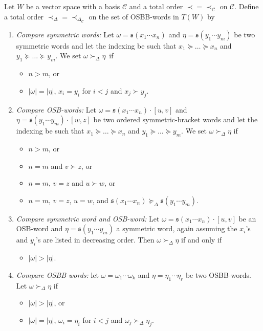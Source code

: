 \documentclass[pdftex]{sigma}
\numberwithin{equation}{section}
\begin{document}
\begin{Definition}%
 Let $W$ be a vector space with a basis $\mathcal{C}$ and a total order $\prec = \prec_{\mathcal{C}}$ on $\mathcal{C}$. Define a total order $\prec_{\Delta} = \prec_{\Delta_{\mathcal{C}}}$ on the set of OSBB-words in $T(W)$ by
 \begin{enumerate}\itemsep=0pt
 \item[(i)] \textit{Compare symmetric words:} Let $\omega = \mathfrak{s}(x_1 \cdots x_n)$ and $\eta = \mathfrak{s}(y_1 \cdots y_m)$ be two symmetric words and let the indexing be such that $x_1 \succeq \dots \succeq x_n$ and $y_1 \succeq \dots \succeq y_m$. We set $\omega \succ_{\Delta} \eta$~if
 \begin{itemize}\itemsep=0pt
 \item $n>m$, or
 \item $|\omega| = |\eta|$, $x_i = y_i$ for $i<j$ and $x_j \succ y_j$.
 \end{itemize}
 \item[(ii)] \textit{Compare OSB-words:} Let $\omega = \mathfrak{s}(x_1 \cdots x_n)\cdot[u,v]$ and $\eta = \mathfrak{s}(y_1 \cdots y_m)\cdot[w,z]$ be two ordered symmetric-bracket words and let the indexing be such that $x_1 \succeq \dots \succeq x_n$ and $y_1 \succeq \dots \succeq y_m$. We set $\omega \succ_{\Delta} \eta$ if
 \begin{itemize}\itemsep=0pt
 \item $n>m$, or
 \item $n=m$ and $v \succ z$, or
 \item $n=m$, $v=z$ and $u\succ w$, or
 \item $n=m$, $v=z$, $u=w$, and $\mathfrak{s}(x_1 \cdots x_n) \succeq_{\Delta} \mathfrak{s}(y_1 \cdots y_m)$.
 \end{itemize}
 \item[(iii)] \textit{Compare symmetric word and OSB-word:} Let $\omega = \mathfrak{s}(x_1 \cdots x_n)\cdot[u,v]$ be an OSB-word and $\eta = \mathfrak{s}(y_1 \cdots y_m)$ a symmetric word, again assuming the $x_i$'s and $y_i$'s are listed in decreasing order. Then $\omega \succ_{\Delta} \eta$ if and only if
 \begin{itemize}\itemsep=0pt
 \item $|\omega| > |\eta|$.
 \end{itemize}
 \item[(iv)] \textit{Compare OSBB-words:} let $\omega = \omega_1 \cdots \omega_k$ and $\eta = \eta_1 \cdots \eta_r$ be two OSBB-words. Let $\omega \succ_{\Delta} \eta$ if
 \begin{itemize}\itemsep=0pt
 \item $|\omega| > |\eta|$, or
 \item $|\omega|=|\eta|$, $\omega_i = \eta_i$ for $i<j$ and $\omega_j \succ_{\Delta} \eta_j$.
 \end{itemize}
 \end{enumerate}
\end{Definition}
\end{document}
